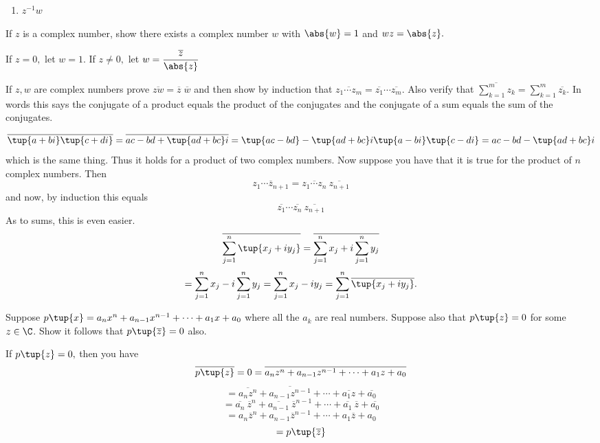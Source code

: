 \begin{enumialphparenastyle}
\begin{ex}
\begin{enumerate}
\item $z^{-1}w$

\end{enumerate}
\end{ex}

\begin{ex} If $z$ is a complex number, show there exists a complex
number $w$ with $\abs{w }=1$ and $wz=\abs{z}.$ 
\begin{sol}
If $z=0,$ let $w =1.$ If $z\neq 0,$ let $w =\displaystyle\frac{\overline{z}}{\abs{z}}$
\end{sol}
\end{ex}

\begin{ex} \label{exer-complex2}If $z,w$ are complex
 numbers prove $
\overline{zw}=\overline{z} \; \overline{w}$ and then show by induction that 
$\overline{z_{1}\cdots z_{m}}=\overline{z_{1}}\cdots \overline{z_{m}}$. Also
verify that $\overline{\sum_{k=1}^{m}z_{k}}=\sum_{k=1}^{m}\overline{z_{k}}$.
In words this says the conjugate of a product equals the product of the
conjugates and the conjugate of a sum equals the sum of the conjugates. 
\begin{sol}
\[
\overline{\tup{a+bi} \tup{c+di} }=\overline{ac-bd+\tup{
ad+bc}i }=\tup{ac-bd} -\tup{ad+bc}i \tup{
a-bi} \tup{c-di} =ac-bd-\tup{ad+bc}i 
\]
 which is the
same thing. Thus it holds for a product of two complex numbers. Now suppose
 you have that it is true for the product of $n$ complex numbers. Then
\[
\overline{z_{1}\cdots z_{n+1}}=\overline{z_{1}\cdots z_{n}}\ \overline{
z_{n+1}}
\]
and now, by induction this equals
\[
\overline{z_{1}}\cdots \overline{z_{n}}\ \overline{z_{n+1}}
\]
As to sums, this is even easier.
\[
\overline{\sum_{j=1}^{n}\tup{x_{j}+iy_{j}} }=\overline{%
\sum_{j=1}^{n}x_{j}+i\sum_{j=1}^{n}y_{j}}
\]
\[
=\sum_{j=1}^{n}x_{j}-i\sum_{j=1}^{n}y_{j}=\sum_{j=1}^{n}x_{j}-iy_{j}=
\sum_{j=1}^{n}\overline{\tup{x_{j}+iy_{j}} }.
\]
\end{sol}
\end{ex}

\begin{ex} \label{15-july-prob2}Suppose $p\tup{x}
=a_{n}x^{n}+a_{n-1}x^{n-1}+\cdots +a_{1}x+a_{0}$ where all the $a_{k}$ are
real numbers. Suppose also that $p\tup{z} =0$ for some $z\in \C$. Show it follows that $p\tup{\overline{z}} =0$ also. 
\begin{sol}
If $p\tup{z} =0,$ then you have
\[
\overline{p\tup{z} }=0=\overline{a_{n}z^{n}+a_{n-1}z^{n-1}+\cdots
+a_{1}z+a_{0}}
\]
\[
=\overline{a_{n}z^{n}}+\overline{a_{n-1}z^{n-1}}+\cdots +\overline{a_{1}z}+
\overline{a_{0}}
\]
\[
=\overline{a_{n}}\ \overline{z}^{n}+\overline{a_{n-1}}\ \overline{z}
^{n-1}+\cdots +\overline{a_{1}}\ \overline{z}+\overline{a_{0}}
\]
\[
=a_{n}\overline{z}^{n}+a_{n-1}\overline{z}^{n-1}+\cdots +a_{1}\overline{z}
+a_{0}
\]
\[
=p\tup{\overline{z}}
\]
\end{sol}
\end{ex}


\end{enumialphparenastyle}
